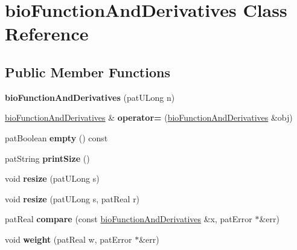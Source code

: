 \hypertarget{classbio_function_and_derivatives}{}\section{bio\+Function\+And\+Derivatives Class Reference}
\label{classbio_function_and_derivatives}
\subsection*{Public Member Functions}
\begin{DoxyCompactItemize}
\item 
\mbox{\label{classbio_function_and_derivatives_af7bf02ef999a016b5cf6a799ebbe9049}} 
{\bfseries bio\+Function\+And\+Derivatives} (pat\+U\+Long n)
\item 
\mbox{\label{classbio_function_and_derivatives_a22f624d3021aeb2b8f381addadc35bdb}} 
\hyperlink{classbio_function_and_derivatives}{bio\+Function\+And\+Derivatives} \& {\bfseries operator=} (\hyperlink{classbio_function_and_derivatives}{bio\+Function\+And\+Derivatives} \&obj)
\item 
\mbox{\label{classbio_function_and_derivatives_a0196f2e3e696b181c04206dae1f28739}} 
pat\+Boolean {\bfseries empty} () const
\item 
\mbox{\label{classbio_function_and_derivatives_a33fd02d55dd96d9702273d99c091dcae}} 
pat\+String {\bfseries print\+Size} ()
\item 
\mbox{\label{classbio_function_and_derivatives_a67e8234925ac56c636e5ce301ff1eba2}} 
void {\bfseries resize} (pat\+U\+Long s)
\item 
\mbox{\label{classbio_function_and_derivatives_a71e63847cf38c5774c8ba6a69d75c4ed}} 
void {\bfseries resize} (pat\+U\+Long s, pat\+Real r)
\item 
\mbox{\label{classbio_function_and_derivatives_a21cc5522dafbf541505d405917dd4f4d}} 
pat\+Real {\bfseries compare} (const \hyperlink{classbio_function_and_derivatives}{bio\+Function\+And\+Derivatives} \&x, pat\+Error $\ast$\&err)
\item 
\mbox{\label{classbio_function_and_derivatives_afbd2fbd35daccb6574d3878dbbaae87c}} 
void {\bfseries weight} (pat\+Real w, pat\+Error $\ast$\&err)
\end{DoxyCompactItemize}
